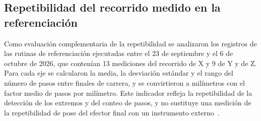 \subsection{Repetibilidad del recorrido medido en la referenciación}

Como evaluación complementaria de la repetibilidad se analizaron los registros de las rutinas de referenciación ejecutadas entre el 23 de septiembre y el 6 de octubre de 2026, que contenían 13 mediciones del recorrido de X y 9 de Y y de Z. Para cada eje se calcularon la media, la desviación estándar y el rango del número de pasos entre finales de carrera, y se convirtieron a milímetros con el factor medio de pasos por milímetro. Este indicador refleja la repetibilidad de la detección de los extremos y del conteo de pasos, y no sustituye una medición de la repetibilidad de pose del efector final con un instrumento externo~\cite{iso9283}.
